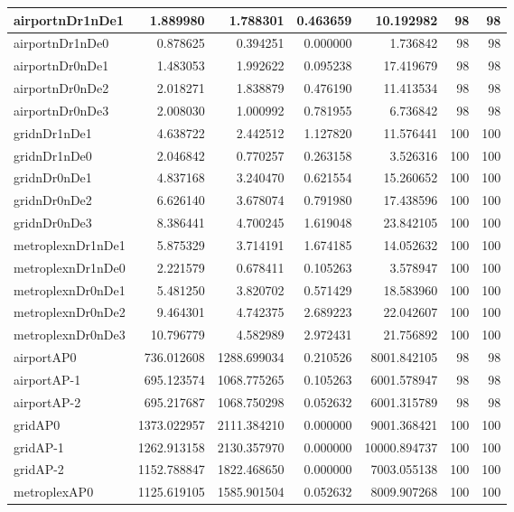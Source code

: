 \begin{longtable}{|l|r|r|r|r|r|r|}
\endlastfoot
airportnDr1nDe1 & 1.889980 & 1.788301 & 0.463659 & 10.192982 & 98 & 98 \\ \hline
airportnDr1nDe0 & 0.878625 & 0.394251 & 0.000000 & 1.736842 & 98 & 98 \\ \hline
airportnDr0nDe1 & 1.483053 & 1.992622 & 0.095238 & 17.419679 & 98 & 98 \\ \hline
airportnDr0nDe2 & 2.018271 & 1.838879 & 0.476190 & 11.413534 & 98 & 98 \\ \hline
airportnDr0nDe3 & 2.008030 & 1.000992 & 0.781955 & 6.736842 & 98 & 98 \\ \hline
gridnDr1nDe1 & 4.638722 & 2.442512 & 1.127820 & 11.576441 & 100 & 100 \\ \hline
gridnDr1nDe0 & 2.046842 & 0.770257 & 0.263158 & 3.526316 & 100 & 100 \\ \hline
gridnDr0nDe1 & 4.837168 & 3.240470 & 0.621554 & 15.260652 & 100 & 100 \\ \hline
gridnDr0nDe2 & 6.626140 & 3.678074 & 0.791980 & 17.438596 & 100 & 100 \\ \hline
gridnDr0nDe3 & 8.386441 & 4.700245 & 1.619048 & 23.842105 & 100 & 100 \\ \hline
metroplexnDr1nDe1 & 5.875329 & 3.714191 & 1.674185 & 14.052632 & 100 & 100 \\ \hline
metroplexnDr1nDe0 & 2.221579 & 0.678411 & 0.105263 & 3.578947 & 100 & 100 \\ \hline
metroplexnDr0nDe1 & 5.481250 & 3.820702 & 0.571429 & 18.583960 & 100 & 100 \\ \hline
metroplexnDr0nDe2 & 9.464301 & 4.742375 & 2.689223 & 22.042607 & 100 & 100 \\ \hline
metroplexnDr0nDe3 & 10.796779 & 4.582989 & 2.972431 & 21.756892 & 100 & 100 \\ \hline
airportAP0 & 736.012608 & 1288.699034 & 0.210526 & 8001.842105 & 98 & 98 \\ \hline
airportAP-1 & 695.123574 & 1068.775265 & 0.105263 & 6001.578947 & 98 & 98 \\ \hline
airportAP-2 & 695.217687 & 1068.750298 & 0.052632 & 6001.315789 & 98 & 98 \\ \hline
gridAP0 & 1373.022957 & 2111.384210 & 0.000000 & 9001.368421 & 100 & 100 \\ \hline
gridAP-1 & 1262.913158 & 2130.357970 & 0.000000 & 10000.894737 & 100 & 100 \\ \hline
gridAP-2 & 1152.788847 & 1822.468650 & 0.000000 & 7003.055138 & 100 & 100 \\ \hline
metroplexAP0 & 1125.619105 & 1585.901504 & 0.052632 & 8009.907268 & 100 & 100 \\ \hline

\end{longtable}
